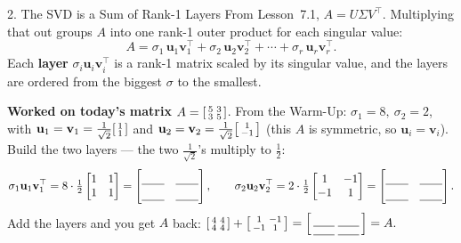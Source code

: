 \documentclass[10pt]{article}
\newcommand{\uu}{\mathbf{u}}
\newcommand{\vv}{\mathbf{v}}
\newcommand{\T}{^{\top}}
\begin{document}
\begin{notesbox}{2. The SVD is a Sum of Rank-1 Layers}
From Lesson~7.1, $A=U\Sigma V\T$. Multiplying that out groups $A$ into one rank-1 outer product for each
singular value:
\[
  A=\sigma_1\,\uu_1\vv_1\T+\sigma_2\,\uu_2\vv_2\T+\cdots+\sigma_r\,\uu_r\vv_r\T .
\]
Each \textbf{layer} $\sigma_i\uu_i\vv_i\T$ is a rank-1 matrix scaled by its singular value, and the layers
are ordered from the biggest $\sigma$ to the smallest.

\vspace{2pt}
\textbf{Worked on today's matrix} $A=\begin{bsmallmatrix} 5 & 3\\ 3 & 5 \end{bsmallmatrix}$. From the
Warm-Up: $\sigma_1=8,\ \sigma_2=2$, with $\uu_1=\vv_1=\tfrac1{\sqrt2}\begin{bsmallmatrix} 1\\1 \end{bsmallmatrix}$
and $\uu_2=\vv_2=\tfrac1{\sqrt2}\begin{bsmallmatrix} 1\\-1 \end{bsmallmatrix}$ (this $A$ is symmetric, so
$\uu_i=\vv_i$). Build the two layers --- the two $\tfrac1{\sqrt2}$'s multiply to $\tfrac12$:
\[
  \sigma_1\uu_1\vv_1\T=8\cdot\tfrac12\begin{bmatrix} 1 & 1\\ 1 & 1 \end{bmatrix}
  =\begin{bmatrix}\rule{0pt}{1.1em}\blank{0.7cm} & \blank{0.7cm}\\[2pt]\blank{0.7cm} & \blank{0.7cm}\end{bmatrix},\qquad
  \sigma_2\uu_2\vv_2\T=2\cdot\tfrac12\begin{bmatrix} 1 & -1\\ -1 & 1 \end{bmatrix}
  =\begin{bmatrix}\rule{0pt}{1.1em}\blank{0.7cm} & \blank{0.7cm}\\[2pt]\blank{0.7cm} & \blank{0.7cm}\end{bmatrix}.
\]
Add the layers and you get $A$ back:
$\begin{bsmallmatrix} 4 & 4\\ 4 & 4 \end{bsmallmatrix}+\begin{bsmallmatrix} 1 & -1\\ -1 & 1 \end{bsmallmatrix}
=\begin{bsmallmatrix}\rule{0pt}{1em}\blank{0.6cm} & \blank{0.6cm}\\[1pt]\blank{0.6cm} & \blank{0.6cm}\end{bsmallmatrix}=A.$
\end{notesbox}
\end{document}
